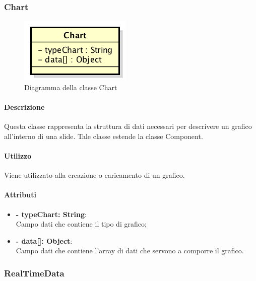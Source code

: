 	
\newpage


\subsubsection{Chart}

	\begin{figure}[h]
		\centering
		\includegraphics[width=0.4\linewidth]{img/premi_front_end_model_chart}
		\caption[Diagramma della classe Chart]{Diagramma della classe Chart}
		\label{fig:back_end_premi_model_chart}
	\end{figure}
	
	\paragraph{Descrizione}
	Questa classe rappresenta la struttura di dati necessari per descrivere un grafico all'interno di una \gls{slide}. Tale classe estende la classe Component.
	
	\paragraph{Utilizzo}
	Viene utilizzato alla creazione o caricamento di un grafico.
	
	\paragraph{Attributi}
	\begin{itemize}
		\item \textbf{- typeChart: String}:\\
			Campo dati che contiene il tipo di grafico;
		\item \textbf{- data[]: Object}:\\
			Campo dati che contiene l'array di dati che servono a comporre il grafico.
	\end{itemize}


\newpage


\subsubsection{RealTimeData}

